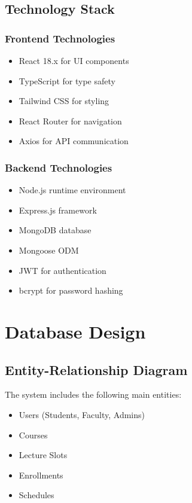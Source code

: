 \documentclass[12pt,a4paper]{report}
\begin{document}
\subsection{Technology Stack}

\subsubsection{Frontend Technologies}
\begin{itemize}[leftmargin=*]
    \item React 18.x for UI components
    \item TypeScript for type safety
    \item Tailwind CSS for styling
    \item React Router for navigation
    \item Axios for API communication
\end{itemize}

\subsubsection{Backend Technologies}
\begin{itemize}[leftmargin=*]
    \item Node.js runtime environment
    \item Express.js framework
    \item MongoDB database
    \item Mongoose ODM
    \item JWT for authentication
    \item bcrypt for password hashing
\end{itemize}

\section{Database Design}

\subsection{Entity-Relationship Diagram}
The system includes the following main entities:
\begin{itemize}[leftmargin=*]
    \item Users (Students, Faculty, Admins)
    \item Courses
    \item Lecture Slots
    \item Enrollments
    \item Schedules
\end{itemize}
\end{document}
